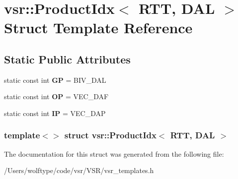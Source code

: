 \hypertarget{structvsr_1_1_product_idx_3_01_r_t_t_00_01_d_a_l_01_4}{\section{vsr\-:\-:Product\-Idx$<$ R\-T\-T, D\-A\-L $>$ Struct Template Reference}
\label{structvsr_1_1_product_idx_3_01_r_t_t_00_01_d_a_l_01_4}
}
\subsection*{Static Public Attributes}
\begin{DoxyCompactItemize}
\item 
\hypertarget{structvsr_1_1_product_idx_3_01_r_t_t_00_01_d_a_l_01_4_a219a6aa90328e699b3c3fd76b68c8997}{static const int {\bfseries G\-P} = B\-I\-V\-\_\-\-D\-A\-L}\label{structvsr_1_1_product_idx_3_01_r_t_t_00_01_d_a_l_01_4_a219a6aa90328e699b3c3fd76b68c8997}

\item 
\hypertarget{structvsr_1_1_product_idx_3_01_r_t_t_00_01_d_a_l_01_4_a8d6a85b83cdeaac9c95c4e04e21689f1}{static const int {\bfseries O\-P} = V\-E\-C\-\_\-\-D\-A\-F}\label{structvsr_1_1_product_idx_3_01_r_t_t_00_01_d_a_l_01_4_a8d6a85b83cdeaac9c95c4e04e21689f1}

\item 
\hypertarget{structvsr_1_1_product_idx_3_01_r_t_t_00_01_d_a_l_01_4_a50de11f9bb171a4ebe06f23452cb4da2}{static const int {\bfseries I\-P} = V\-E\-C\-\_\-\-D\-A\-P}\label{structvsr_1_1_product_idx_3_01_r_t_t_00_01_d_a_l_01_4_a50de11f9bb171a4ebe06f23452cb4da2}

\end{DoxyCompactItemize}
\subsubsection*{template$<$$>$ struct vsr\-::\-Product\-Idx$<$ R\-T\-T, D\-A\-L $>$}



The documentation for this struct was generated from the following file\-:\begin{DoxyCompactItemize}
\item 
/\-Users/wolftype/code/vsr/\-V\-S\-R/vsr\-\_\-templates.\-h\end{DoxyCompactItemize}
